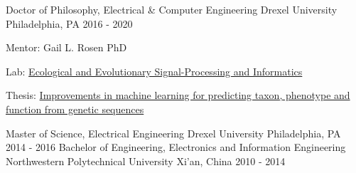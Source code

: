 

\begin{cventries}

  \cventry
    {Doctor of Philosophy, Electrical \& Computer Engineering} %
    {Drexel University} %
    {Philadelphia, PA} %
    {2016 - 2020} %
    {
     \begin{cvitems} %
         \item Mentor: Gail L. Rosen PhD
         \item Lab: \href{http://drexeleesi.com/}{Ecological and Evolutionary Signal-Processing and Informatics}
	 \item Thesis: \href{https://drexel.primo.exlibrisgroup.com/permalink/01DRXU_INST/1aqopv8/alma991014833048604721}{Improvements in machine learning for predicting taxon, phenotype and function from genetic sequences}
      \end{cvitems}
    }
  
  \cventry
    {Master of Science, Electrical Engineering} %
    {Drexel University} %
    {Philadelphia, PA} %
    {2014 - 2016} %
    {}
  \vspace{-0.3cm}  
  \cventry
    {Bachelor of Engineering, Electronics and Information Engineering} %
    {Northwestern Polytechnical University} %
    {Xi'an, China} %
    {2010 - 2014} %
    {}
  \vspace{-0.6cm}  

\end{cventries}
